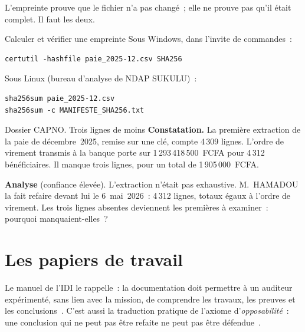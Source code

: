 L'empreinte prouve que le fichier n'a pas changé~; elle ne prouve pas qu'il
était complet. Il faut les deux.

\begin{boxoutils}{Calculer et vérifier une empreinte}
Sous Windows, dans l'invite de commandes~:
\begin{lstlisting}
certutil -hashfile paie_2025-12.csv SHA256
\end{lstlisting}
Sous Linux (bureau d'analyse de NDAP SUKULU)~:
\begin{lstlisting}
sha256sum paie_2025-12.csv
sha256sum -c MANIFESTE_SHA256.txt
\end{lstlisting}
\end{boxoutils}

\begin{boxscenario}{Dossier CAPNO. Trois lignes de moins}
\textbf{Constatation.} La première extraction de la paie de décembre~2025,
remise sur une clé, compte 4\,309 lignes. L'ordre de virement transmis à la
banque porte sur 1\,293\,418\,500~FCFA pour 4\,312 bénéficiaires. Il manque
trois lignes, pour un total de 1\,905\,000~FCFA.

\medskip
\textbf{Analyse} (confiance élevée). L'extraction n'était pas exhaustive.
M.~HAMADOU la fait refaire devant lui le 6~mai~2026~: 4\,312 lignes, totaux
égaux à l'ordre de virement. Les trois lignes absentes deviennent les
premières à examiner~: pourquoi manquaient-elles~?
\end{boxscenario}

\separateur

\section{Les papiers de travail}
\label{sec:c07-papiers}

Le manuel de l'IDI le rappelle~: la documentation doit permettre à un
auditeur expérimenté, sans lien avec la mission, de comprendre les travaux,
les preuves et les conclusions~\cite{idi2021conformite}. C'est aussi la
traduction pratique de l'axiome d'\emph{opposabilité}~: une conclusion qui
ne peut pas être refaite ne peut pas être défendue~\cite{minka2026auditologie}.

